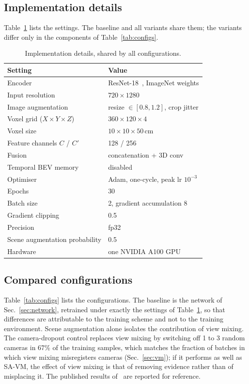 \documentclass[10pt,twocolumn,letterpaper]{article}
\begin{document}
\subsection{Implementation details}
Table~\ref{tab:impl} lists the settings. The baseline and all variants share them; the variants differ only in the
components of Table~\ref{tab:configs}.

\begin{table}[t]
\centering
\small
\caption{Implementation details, shared by all configurations.}
\label{tab:impl}
\begin{tabular}{@{}ll@{}}
\toprule
Setting & Value \\
\midrule
Encoder & ResNet-18~\cite{he2016resnet}, ImageNet weights \\
Input resolution & $720 \times 1280$ \\
Image augmentation & resize $\in [0.8, 1.2]$, crop jitter \\
Voxel grid ($X \times Y \times Z$) & $360 \times 120 \times 4$ \\
Voxel size & $10 \times 10 \times 50$\,cm \\
Feature channels $C$ / $C'$ & 128 / 256 \\
Fusion & concatenation + 3D conv \\
Temporal BEV memory & disabled \\
Optimiser & Adam, one-cycle, peak lr $10^{-3}$ \\
Epochs & 30 \\
Batch size & 2, gradient accumulation 8 \\
Gradient clipping & 0.5 \\
Precision & fp32 \\
Scene augmentation probability & 0.5 \\
Hardware & one NVIDIA A100 GPU \\
\bottomrule
\end{tabular}
\end{table}

\subsection{Compared configurations}
\label{sec:configs}
Table~\ref{tab:configs} lists the configurations. The baseline is the network of Sec.~\ref{sec:network}, retrained
under exactly the settings of Table~\ref{tab:impl}, so that differences are attributable to the training scheme and
not to the training environment. Scene augmentation alone isolates the contribution of view mixing. The
camera-dropout control replaces view mixing by switching off 1 to 3 random cameras in 67\% of the training samples,
which matches the fraction of batches in which view mixing misregisters cameras (Sec.~\ref{sec:vm}); if it performs
as well as SA-VM, the effect of view mixing is that of removing evidence rather than of misplacing it. The published
results of~\cite{teepe2024lifting} are reported for reference.
\end{document}
